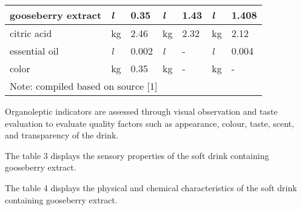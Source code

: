 \begin{table}[H]
\begin{tabular}{|lllllll|}
  \multicolumn{1}{|l|}{gooseberry extract}            & \multicolumn{1}{l|}{\textit{l}}     & \multicolumn{1}{l|}{0.35}     & \multicolumn{1}{l|}{\textit{l}}     & \multicolumn{1}{l|}{1.43}     & \multicolumn{1}{l|}{\textit{l}}     & 1.408    \\ \hline
  \multicolumn{1}{|l|}{citric acid}                   & \multicolumn{1}{l|}{kg}             & \multicolumn{1}{l|}{2.46}     & \multicolumn{1}{l|}{kg}             & \multicolumn{1}{l|}{2.32}     & \multicolumn{1}{l|}{kg}             & 2.12     \\ \hline
  \multicolumn{1}{|l|}{essential oil}                 & \multicolumn{1}{l|}{\textit{l}}     & \multicolumn{1}{l|}{0.002}    & \multicolumn{1}{l|}{\textit{l}}     & \multicolumn{1}{l|}{-}        & \multicolumn{1}{l|}{\textit{l}}     & 0.004    \\ \hline
  \multicolumn{1}{|l|}{color}                         & \multicolumn{1}{l|}{kg}             & \multicolumn{1}{l|}{0.35}     & \multicolumn{1}{l|}{kg}             & \multicolumn{1}{l|}{-}        & \multicolumn{1}{l|}{kg}             & -        \\ \hline
  \multicolumn{7}{|l|}{Note: compiled based on source {[}1{]}}                                                                                                                                                                                     \\ \hline
  \end{tabular}
  \end{table}

\begin{multicols}{2}

Organoleptic indicators are assessed through visual observation and
taste evaluation to evaluate quality factors such as appearance, colour,
taste, scent, and transparency of the drink.~

The table 3 displays the sensory properties of the soft drink containing
gooseberry extract.~

The table 4 displays the physical and chemical characteristics of the
soft drink containing gooseberry extract.
\end{multicols}



